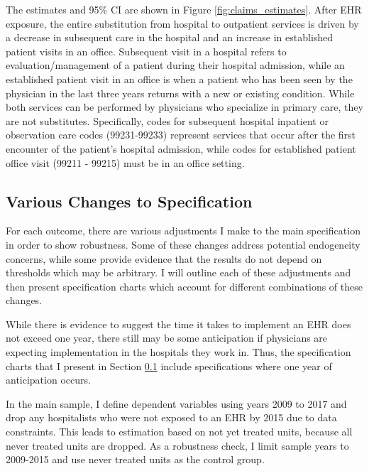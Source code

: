 \documentclass[12pt]{article}
\begin{document}
The estimates and 95\% CI are shown in Figure \ref{fig:claims_estimates}. After EHR exposure, the entire substitution from hospital to outpatient services is driven by a decrease in subsequent care in the hospital and an increase in established patient visits in an office. Subsequent visit in a hospital refers to evaluation/management of a patient during their hospital admission, while an established patient visit in an office is when a patient who has been seen by the physician in the last three years returns with a new or existing condition. While both services can be performed by physicians who specialize in primary care, they are not substitutes. Specifically, codes for subsequent hospital inpatient or observation care codes (99231-99233) represent services that occur after the first encounter of the patient's hospital admission, while codes for established patient office visit (99211 - 99215) must be in an office setting. 



\subsection{Various Changes to Specification}\label{sec:changes}

For each outcome, there are various adjustments I make to the main specification in order to show robustness. Some of these changes address potential endogeneity concerns, while some provide evidence that the results do not depend on thresholds which may be arbitrary. I will outline each of these adjustments and then present specification charts which account for different combinations of these changes. 

While there is evidence to suggest the time it takes to implement an EHR does not exceed one year, there still may be some anticipation if physicians are expecting implementation in the hospitals they work in. Thus, the specification charts that I present in Section \ref{sec:changes} include specifications where one year of anticipation occurs. 

In the main sample, I define dependent variables using years 2009 to 2017 and drop any hospitalists who were not exposed to an EHR by 2015 due to data constraints. This leads to estimation based on not yet treated units, because all never treated units are dropped. As a robustness check, I limit sample years to 2009-2015 and use never treated units as the control group. 
\end{document}
